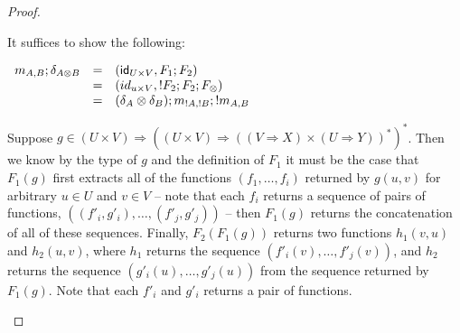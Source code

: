 \begin{proof}
\begin{report}
\begin{center}
\begin{itemize}
      It suffices to show the following:
      \begin{center}
        \begin{math}
          \begin{array}{lll}
            m_{A,B};\delta_{A \otimes B}
            & = & (\mathsf{id}_{U \times V},F_1;F_2)\\
            & = & (id_{u \times V},!F_2;F_2;F_\otimes)\\
            & = & (\delta_A \otimes \delta_B);m_{!A,!B};!m_{A,B}
          \end{array}
        \end{math}
      \end{center}
      Suppose $g \in (U \times V) \Rightarrow ((U \times V)
      \Rightarrow ((V \Rightarrow X) \times (U \Rightarrow Y))^*)^*$.
      Then we know by the type of $g$ and the definition of $F_1$ it
      must be the case that $F_1(g)$ first extracts all of the
      functions $(f_1,\ldots,f_i)$ returned by $g(u,v)$ for arbitrary
      $u \in U$ and $v \in V$ -- note that each $f_i$ returns a
      sequence of pairs of functions,
      $((f'_i,g'_i),\ldots,(f'_j,g'_j))$ -- then $F_1(g)$ returns the
      concatenation of all of these sequences.  Finally, $F_2(F_1(g))$
      returns two functions $h_1(v,u)$ and $h_2(u,v)$, where $h_1$
      returns the sequence $(f'_i(v),\ldots,f'_j(v))$, and $h_2$
      returns the sequence $(g'_i(u),\ldots,g'_j(u))$ from the
      sequence returned by $F_1(g)$.  Note that each $f'_i$ and $g'_i$
      returns a pair of functions.


\end{itemize}
\end{center}
\end{report}
\end{proof}
